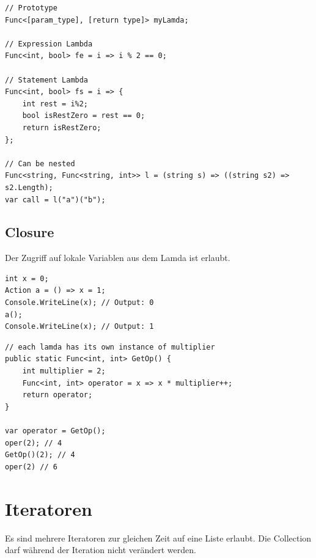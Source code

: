 \documentclass[
a4paper,
oneside,
10pt,
fleqn,
headsepline,
toc=listofnumbered, 
bibliography=totocnumbered]{scrartcl}
\let\stdsection\section
\renewcommand\section{\clearpage\stdsection}
\begin{document}
\begin{lstlisting}
// Prototype
Func<[param_type], [return type]> myLamda;

// Expression Lambda
Func<int, bool> fe = i => i % 2 == 0;

// Statement Lambda
Func<int, bool> fs = i => {
	int rest = i%2;
	bool isRestZero = rest == 0;
	return isRestZero;
};

// Can be nested
Func<string, Func<string, int>> l = (string s) => ((string s2) => s2.Length);
var call = l("a")("b");
\end{lstlisting}

\subsection{Closure}
Der Zugriff auf lokale Variablen aus dem Lamda ist erlaubt.
\begin{lstlisting}
int x = 0;
Action a = () => x = 1;
Console.WriteLine(x); // Output: 0
a();
Console.WriteLine(x); // Output: 1
\end{lstlisting}

\begin{lstlisting}
// each lamda has its own instance of multiplier
public static Func<int, int> GetOp() {
	int multiplier = 2;
	Func<int, int> operator = x => x * multiplier++;
	return operator;
}

var operator = GetOp();
oper(2); // 4
GetOp()(2); // 4
oper(2) // 6
\end{lstlisting}


\section{Iteratoren}
Es sind mehrere Iteratoren zur gleichen Zeit auf eine Liste erlaubt. Die Collection darf während der Iteration nicht verändert werden.
\end{document}
